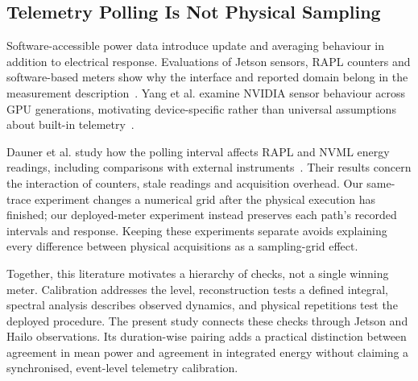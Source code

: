 \subsection{Telemetry Polling Is Not Physical Sampling}
Software-accessible power data introduce update and averaging behaviour in addition to electrical response. Evaluations of Jetson sensors, RAPL counters and software-based meters show why the interface and reported domain belong in the measurement description~\cite{aslan2022jetsonbuiltin,alt2024raplheteromemory,jay2023softwarepowermeters}. Yang et al. examine NVIDIA sensor behaviour across GPU generations, motivating device-specific rather than universal assumptions about built-in telemetry~\cite{yang2024parttime}.

Dauner et al. study how the polling interval affects RAPL and NVML energy readings, including comparisons with external instruments~\cite{dauner2026frequency}. Their results concern the interaction of counters, stale readings and acquisition overhead. Our same-trace experiment changes a numerical grid after the physical execution has finished; our deployed-meter experiment instead preserves each path's recorded intervals and response. Keeping these experiments separate avoids explaining every difference between physical acquisitions as a sampling-grid effect.

Together, this literature motivates a hierarchy of checks, not a single winning meter. Calibration addresses the level, reconstruction tests a defined integral, spectral analysis describes observed dynamics, and physical repetitions test the deployed procedure. The present study connects these checks through Jetson and Hailo observations. Its duration-wise pairing adds a practical distinction between agreement in mean power and agreement in integrated energy without claiming a synchronised, event-level telemetry calibration.
